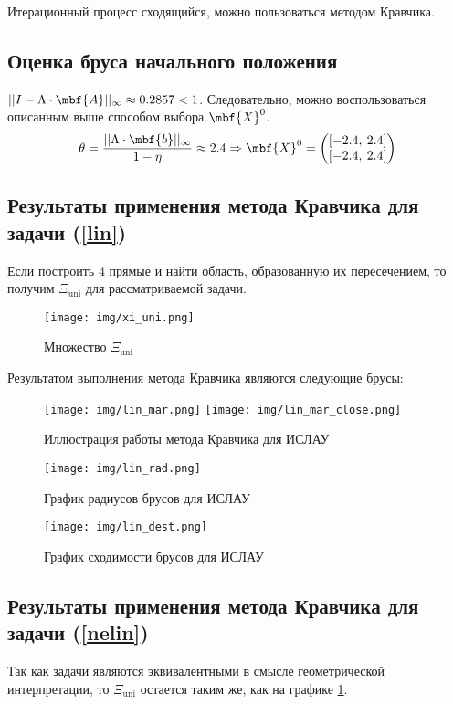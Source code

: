 \documentclass[a4paper]{article}
\begin{document}
Итерационный процесс сходящийся, можно пользоваться методом Кравчика.
\subsection{Оценка бруса начального положения}
$||I-\Lambda\cdot\mbf{A}||_\infty\approx0.2857<1$. Следовательно, можно воспользоваться описанным выше способом выбора $\mbf{X}^0$.
$$\theta=\frac{||\Lambda\cdot\mbf{b}||_\infty}{1-\eta}\approx2.4\Rightarrow\mbf{X}^0=\begin{pmatrix}[-2.4,\: 2.4]\\ [-2.4,\: 2.4]\end{pmatrix}$$
\subsection{Результаты применения метода Кравчика для задачи (\ref{lin})}
Если построить 4 прямые и найти область, образованную их пересечением, то получим $\Xi_{\mathrm{uni}}$ для рассматриваемой задачи.
\begin{figure}[H]
    \centering
    \texttt{[image: img/xi\_uni.png]}
    \caption{Множество $\Xi_{\mathrm{uni}}$}
    \label{fig:xi}
\end{figure}
Результатом выполнения метода Кравчика являются следующие брусы:
\begin{figure}[H]
    \centering
    \texttt{[image: img/lin\_mar.png]}
    \texttt{[image: img/lin\_mar\_close.png]}
    \caption{Иллюстрация работы метода Кравчика для ИСЛАУ}
    \label{fig:islau_krav}
\end{figure}
\begin{figure}[H]
    \centering
    \texttt{[image: img/lin\_rad.png]}
    \caption{График радиусов брусов для ИСЛАУ}
    \label{fig:islau_rad}
\end{figure}
\begin{figure}[H]
    \centering
    \texttt{[image: img/lin\_dest.png]}
    \caption{График сходимости брусов для ИСЛАУ}
    \label{fig:islau_dest}
\end{figure}
\subsection{Результаты применения метода Кравчика для задачи (\ref{nelin})}
Так как задачи являются эквивалентными в смысле геометрической интерпретации, то $\Xi_{\mathrm{uni}}$ остается таким же, как на графике \ref{fig:xi}.
\end{document}
